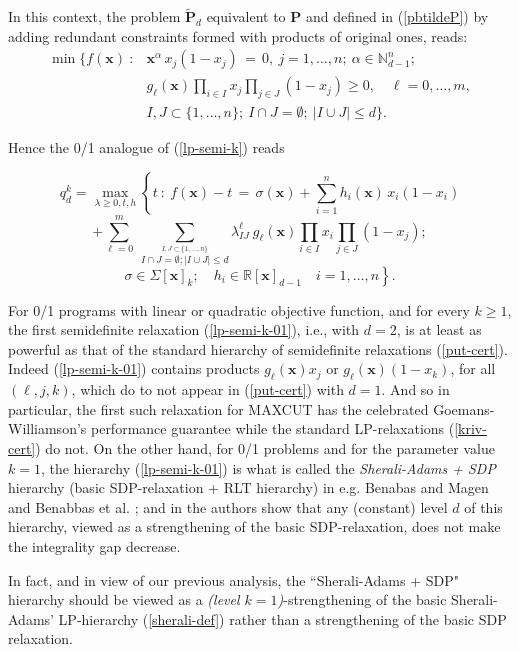 \documentclass[11pt]{article}
\numberwithin{equation}{section}
\def\x{\mathbf{x}}
\def\R{\mathbb{R}}
\def\N{\mathbb{N}}
\def\P{\mathbf{P}}
\begin{document}
In this context, the problem $\tilde{\P}_d$ equivalent to $\P$  and defined in (\ref{pbtildeP})
by adding redundant constraints formed with products of original ones, reads:
\[\begin{array}{rl}
\min\{f(\x)\::& \x^\alpha \,x_j(1-x_j)\,=\,0,\: j=1,\ldots,n;\:\alpha\in\N^n_{d-1};\\
&g_\ell(\x)\displaystyle\prod_{i\in I}x_j\displaystyle\prod_{j\in J}(1-x_j)\geq0,\quad \ell=0,\ldots,m,\\
&I,J\subset\{1,\ldots,n\};\:I\cap J=\emptyset;\:\vert I\cup J\vert\leq d\}.
\end{array}\]

Hence the 0/1 analogue of (\ref{lp-semi-k})  reads

\[q^k_d=\displaystyle\max_{\lambda\geq0,t,h}\left \{ t\::\:f(\x)-t\,=\,\sigma(\x)+\sum_{i=1}^nh_i(\x)\,x_i(1-x_i)\right.\]
\[+\sum_{\ell=0}^m\:\displaystyle\sum_{\stackrel{I,J\subset\{1,\ldots,n\}}{
I\cap J=\emptyset; \vert I\cup J\vert \leq d}}
\lambda^\ell_{IJ}\:g_\ell(\x)\prod_{i\in I}x_i\prod_{j\in J}(1-x_j);\]
\begin{equation}
 \label{lp-semi-k-01}
\left.\sigma\in\Sigma[\x]_{k};\quad h_i\in\R[\x]_{d-1} \quad i=1,\ldots,n\right\}.\end{equation}

For 0/1 programs with linear or quadratic objective function, and for every $k\geq1$,
the first semidefinite relaxation (\ref{lp-semi-k-01}), i.e., with $d=2$,
is at least as powerful as that of the standard hierarchy of semidefinite relaxations (\ref{put-cert}).
Indeed (\ref{lp-semi-k-01}) contains products $g_\ell(\x)x_j$ or $g_\ell(\x)(1-x_k)$, for all $(\ell,j,k)$, which do  to not appear in (\ref{put-cert}) with $d=1$.
And so in particular, the first such relaxation for MAXCUT has the celebrated Goemans-Williamson's performance guarantee
while the standard LP-relaxations (\ref{kriv-cert}) do not. On the other hand, for 0/1 problems
and for the parameter value $k=1$,
the hierarchy (\ref{lp-semi-k-01}) is what is called the {\it Sherali-Adams + SDP} hierarchy 
(basic SDP-relaxation + RLT hierarchy)
in e.g. Benabas and Magen \cite{benabbas1} and Benabbas et al. \cite{benabbas2}; 
and in \cite{benabbas1,benabbas2} the authors show that any (constant) level $d$ of this hierarchy,
viewed as a strengthening of the basic SDP-relaxation, does not make the integrality gap decrease.

In fact, and in view of our previous analysis, the ``Sherali-Adams + SDP" hierarchy should be viewed as 
a {\it (level $k=1$)}-strengthening of the basic Sherali-Adams'  LP-hierarchy
(\ref{sherali-def})  rather than a strengthening of the basic SDP relaxation.
\end{document}
